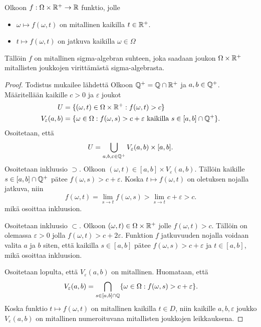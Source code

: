 \documentclass[12pt,oneside,a4paper]{amsbook} %
\begin{document}
\begin{lemma}\label{le:caratheodoryIsMeasurable}
    Olkoon $f:\Omega \times {\mathbb{R}^{+}} \to \mathbb{R}$ funktio, jolle
    \begin{itemize}
        \item $\omega \mapsto f(\omega, t)$  on mitallinen kaikilla $t \in {\mathbb{R}^{+}}$.
        \item $t \mapsto f(\omega, t)$ on jatkuva kaikilla $\omega \in \Omega$
    \end{itemize}
    Tällöin $f$ on mitallinen sigma-algebran suhteen, joka saadaan joukon $\Omega \times {\mathbb{R}^{+}}$ mitallisten joukkojen virittämästä sigma-algebrasta.
\end{lemma}
\begin{proof}
    Todistus mukailee lähdettä \cite{optimal}
    Olkoon $\mathbb{Q}^{+} = \mathbb{Q} \cap {\mathbb{R}^{+}}$ ja $a, b \in \mathbb{Q}^{+}$. Määritellään kaikille $c > 0$ ja $\varepsilon$ joukot 
    \begin{align*}
        U &= \{(\omega, t) \in \Omega\times {\mathbb{R}^{+}} : f(\omega, t) > c\} \\
        V_\varepsilon(a, b) &= \{\omega \in \Omega : f(\omega, s) > c + \varepsilon \text{ kaikilla } s \in [a,b]\cap \mathbb{Q}^{+}\}.
    \end{align*}
Osoitetaan, että
\begin{equation*}
    U = \bigcup_{a, b, \varepsilon \in \mathbb{Q}^{+}} V_\varepsilon(a,b) \times [a,b].
\end{equation*}
Osoitetaan inkluusio $\supset$. Olkoon $(\omega, t) \in [a, b] \times V_\varepsilon(a, b)$. Tällöin kaikille $s\in [a, b] \cap \mathbb{Q}^{+}$ pätee $f(\omega, s) > c + \varepsilon$. Koska $t \mapsto f(\omega, t)$ on oletuksen nojalla jatkuva, niin 
    \begin{equation*}
        f(\omega, t) = \lim_{s\to t} f(\omega, s) > \lim_{s\to t} c + \varepsilon > c.
    \end{equation*}
mikä osoittaa inkluusion. 

Osoitetaan inkluusio $\subset$. Olkoon $(\omega, t) \in \Omega \times {\mathbb{R}^{+}} $ jolle $f(\omega, t) > c$. Tällöin on olemassa $\varepsilon > 0$ jolla $f(\omega, t) > c + 2\varepsilon$. Funktion $f$ jatkuvuuden nojalla voidaan valita $a$ ja $b$ siten, että kaikilla $s \in [a, b]$ pätee $f(\omega, s) > c + \varepsilon$ ja $t\in [a,b]$, mikä osoittaa inkluusion.

Osoitetaan lopulta, että $V_\varepsilon(a,b)$ on mitallinen. Huomataan, että
\begin{equation*}
    V_\varepsilon(a,b) = \bigcap_{s \in [a,b]\cap \mathbb{Q}}\{\omega \in \Omega : f(\omega, s) > c + \varepsilon\}.
\end{equation*}
Koska funktio $t \mapsto f(\omega, t)$ on mitallinen kaikilla $t \in D$, niin kaikille $a, b, \varepsilon$ joukko $V_\varepsilon(a, b)$ on mitallinen numeroituvana mitallisten joukkojen leikkauksena.
\end{proof}
\end{document}
